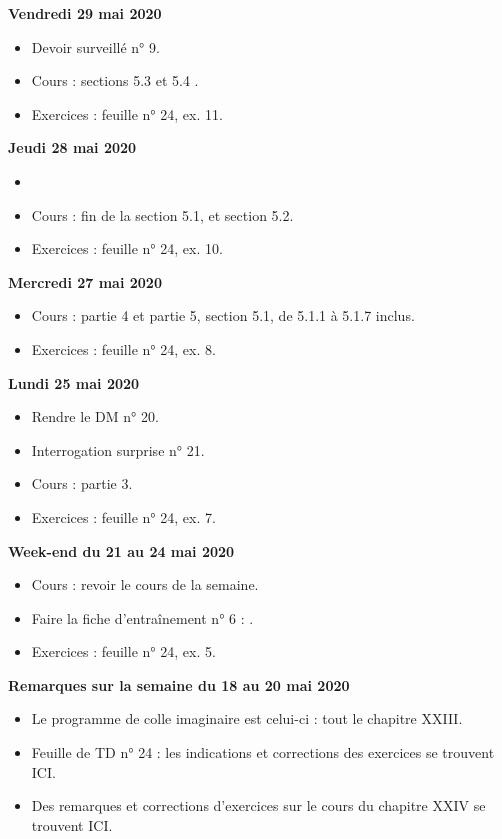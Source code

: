 \documentclass[12pt,a4paper]{article}
\begin{document}
\noindent\textbf{Vendredi 29 mai 2020}
\begin{itemize}
\item Devoir surveillé n° 9.
\item Cours : sections 5.3 et 5.4 .
\item Exercices : feuille n° 24, ex. 11.\vspace{.4cm}
\end{itemize}

\noindent\textbf{Jeudi 28 mai 2020}
\begin{itemize}
\item 
\item Cours : fin de la section 5.1, et section 5.2.
\item Exercices : feuille n° 24, ex. 10.\vspace{.4cm}
\end{itemize}
 
\noindent\textbf{Mercredi 27 mai 2020}
\begin{itemize}
\item Cours : partie 4 et partie 5, section 5.1, de 5.1.1 à 5.1.7 inclus.
\item Exercices : feuille n° 24, ex. 8.\vspace{.4cm}
\end{itemize}
 
\noindent\textbf{Lundi 25 mai 2020}
\begin{itemize}
\item Rendre le DM n° 20.
\item Interrogation surprise n° 21.
\item Cours : partie 3.
\item Exercices : feuille n° 24, ex. 7.\vspace{.4cm}
\end{itemize}

\noindent\textbf{Week-end du 21 au 24 mai 2020}
\begin{itemize}
\item Cours : revoir le cours de la semaine.
\item Faire la fiche d'entraînement n° 6 : .
\item Exercices : feuille n° 24, ex. 5.\vspace{.4cm}
\end{itemize}

\noindent\textbf{\bf Remarques sur la semaine du 18 au 20 mai 2020}
\begin{itemize}
\item Le programme de colle imaginaire est celui-ci : tout le chapitre XXIII.
\item Feuille de TD n° 24 : les indications et corrections des exercices se trouvent ICI.
\item Des remarques et corrections d'exercices sur le cours du chapitre XXIV se trouvent ICI.\vspace{.4cm}
\end{itemize}
 
\end{document}
